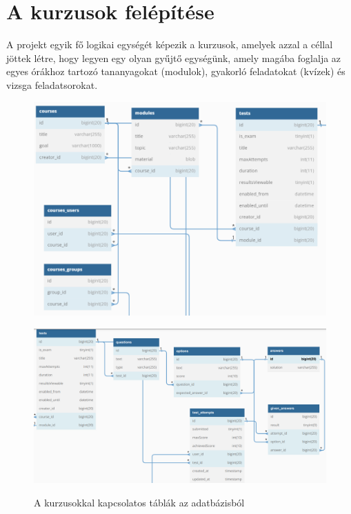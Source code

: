 \documentclass[
]{thesis-ekf}
\theoremstyle{definition}
\theoremstyle{remark}
\begin{document}
            \section{A kurzusok felépítése}
                A projekt egyik fő logikai egységét képezik a kurzusok, amelyek azzal a céllal jöttek létre, hogy legyen egy olyan gyűjtő egységünk, amely magába foglalja az egyes órákhoz tartozó tananyagokat (modulok), gyakorló feladatokat (kvízek) és vizsga feladatsorokat.
                \begin{figure}[ht!]
    		        \centering
    		        \includegraphics[width=15cm]{Kurzusok_db_1.png}
    		        \label{fig-db-kurzusok-1}
              
    		        \centering
    		        \includegraphics[width=15cm]{Kurzusok_db_2.png}
    		        \label{fig-db-kurzusok-2}
                        \caption{A kurzusokkal kapcsolatos táblák az adatbázisból}
    	    \end{figure}
\end{document}
